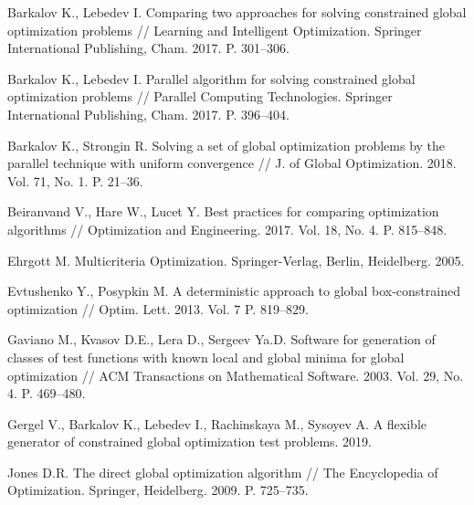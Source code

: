 \documentclass{cmi}
\begin{document}
\begin{biblio_lat}

Barkalov K., Lebedev I.
\newblock Comparing two approaches for solving constrained global optimization
  problems
\newblock // Learning and Intelligent Optimization. Springer International
  Publishing, Cham. 2017. P. 301--306.
\newblock {}

Barkalov K., Lebedev I.
\newblock Parallel algorithm for solving constrained global optimization
  problems
\newblock // Parallel Computing Technologies. Springer International
  Publishing, Cham. 2017. P. 396--404.
\newblock {}

Barkalov K., Strongin R.
\newblock Solving a set of global optimization problems by the parallel
  technique with uniform convergence //
\newblock J. of Global Optimization. 2018. Vol. 71, No. 1. P. 21--36.
\newblock {}

Beiranvand V., Hare W., Lucet Y.
\newblock Best practices for comparing optimization algorithms //
\newblock Optimization and Engineering. 2017. Vol. 18, No. 4. P. 815--848.
\newblock {}

Ehrgott M.
\newblock Multicriteria Optimization.
\newblock Springer-Verlag, Berlin, Heidelberg. 2005.
\newblock {}

Evtushenko Y., Posypkin M.
\newblock A deterministic approach to global box-constrained optimization //
\newblock Optim. Lett. 2013. Vol. 7 P. 819--829.
\newblock {}

{Gaviano M., Kvasov D.E., Lera D., Sergeev Ya.D.}
\newblock Software for generation of classes of test functions with known local
  and global minima for global optimization //
\newblock ACM Transactions on Mathematical Software. 2003. Vol. 29, No. 4. P.
  469--480.
\newblock {}

Gergel V., Barkalov K., Lebedev I., Rachinskaya M., Sysoyev A.
\newblock A flexible generator of constrained global optimization test
  problems. 2019.
\newblock {}

{Jones D.R.}
\newblock The direct global optimization algorithm
\newblock // The Encyclopedia of Optimization. Springer, Heidelberg. 2009. P.
  725--735.
\newblock {}


\end{biblio_lat}
\end{document}
